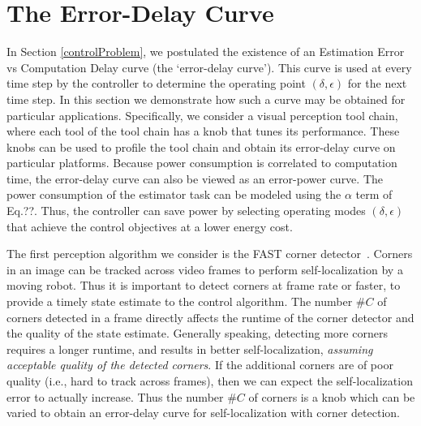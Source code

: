 \section{The Error-Delay Curve}
\label{delayErrorCurve}

In Section \ref{controlProblem}, we postulated the existence of an Estimation Error vs Computation Delay curve (the `error-delay curve').
This curve is used at every time step by the controller to determine the operating point $(\delta, \epsilon)$ for the next time step.
In this section we demonstrate how such a curve may be obtained for particular applications. 
Specifically, we consider a visual perception tool chain, where each tool of the tool chain has a knob that tunes its performance.
These knobs can be used to profile the tool chain and obtain its error-delay curve on particular platforms.
Because power consumption is correlated to computation time, the error-delay curve can also be viewed as an error-power curve.
The power consumption of the estimator task can be modeled using the $\alpha$ term of Eq.??.
Thus, the controller can save power by selecting operating modes $(\delta,\epsilon)$ that achieve the control objectives at a lower energy cost.

The first perception algorithm we consider is the FAST corner detector~\cite{rosten_2006_machine}.
Corners in an image can be tracked across video frames to perform self-localization by a moving robot. 
Thus it is important to detect corners at frame rate or faster, to provide a timely state estimate to the control algorithm.
The number $\#C$ of corners detected in a frame directly affects the runtime of the corner detector and the quality of the state estimate.
Generally speaking, detecting more corners requires a longer runtime, and results in better self-localization, \emph{assuming acceptable quality of the detected corners}.
If the additional corners are of poor quality (i.e., hard to track across frames), then we can expect the self-localization error to actually increase.
Thus the number $\#C$ of corners is a knob which can be varied to obtain an error-delay curve for self-localization with corner detection. 

